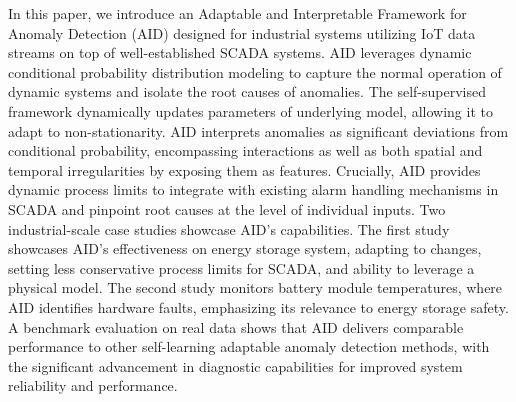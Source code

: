 In this paper, we introduce an Adaptable and Interpretable Framework for Anomaly Detection (AID) designed for industrial systems utilizing IoT data streams on top of well-established SCADA systems. AID leverages dynamic conditional probability distribution modeling to capture the normal operation of dynamic systems and isolate the root causes of anomalies. The self-supervised framework dynamically updates parameters of underlying model, allowing it to adapt to non-stationarity. AID interprets anomalies as significant deviations from conditional probability, encompassing interactions as well as both spatial and temporal irregularities by exposing them as features. Crucially, AID provides dynamic process limits to integrate with existing alarm handling mechanisms in SCADA and pinpoint root causes at the level of individual inputs. Two industrial-scale case studies showcase AID's capabilities. The first study showcases AID's effectiveness on energy storage system, adapting to changes, setting less conservative process limits for SCADA, and ability to leverage a physical model. The second study monitors battery module temperatures, where AID identifies hardware faults, emphasizing its relevance to energy storage safety. A benchmark evaluation on real data shows that AID delivers comparable performance to other self-learning adaptable anomaly detection methods, with the significant advancement in diagnostic capabilities for improved system reliability and performance.
